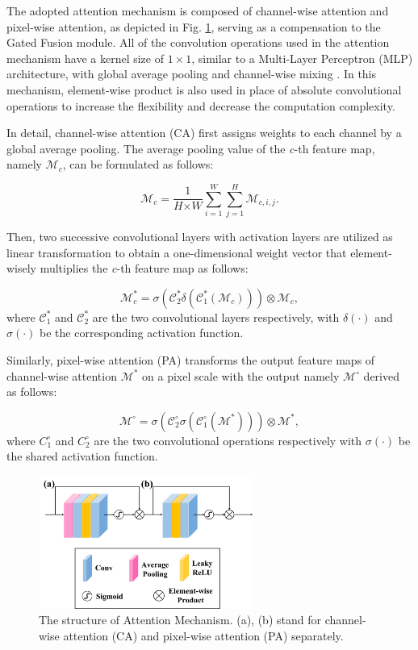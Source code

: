 \documentclass[lettersize,journal]{IEEEtran}
\begin{document}
The adopted attention mechanism is composed of channel-wise attention and pixel-wise attention, as depicted in Fig. \ref{attention}, serving as a compensation to the Gated Fusion module. All of the convolution operations used in the attention mechanism have a kernel size of $1 \times 1$, similar to a Multi-Layer Perceptron (MLP) architecture, with global average pooling and channel-wise mixing \cite{NEURIPS2021_mlp}.  In this mechanism, element-wise product is also used in place of absolute convolutional operations to increase the flexibility and decrease the computation complexity.   

In detail, channel-wise attention (CA) first assigns weights to each channel by a global average pooling. The average pooling value of the \textit{c}-th feature map, namely $\mathcal{M}_{c}$, can be formulated as follows:

\begin{equation}
    \mathcal{M}_{c} = \frac{1}{\textit{H} \times \textit{W}} \sum_{i=1}^\textit{W} \sum_{j=1}^\textit{H} \mathcal{M}_{c,i,j}.
\end{equation}

Then, two successive convolutional layers with activation layers are utilized as linear transformation to obtain a one-dimensional weight vector that element-wisely multiplies the \textit{c}-th feature map as follows:

\begin{equation}
    \mathcal{M}_c^* = \sigma(\mathcal{C}_2^* \delta (\mathcal{C}_1^*(\mathcal{M}_c))) \otimes \mathcal{M}_c,
\end{equation}
where $\mathcal{C}_1^*$ and $\mathcal{C}_2^*$ are the two convolutional layers respectively, with $\delta(\cdot)$ and $\sigma(\cdot)$ be the corresponding activation function. 

Similarly, pixel-wise attention (PA) transforms the output feature maps of channel-wise attention $\mathcal{M}^*$ on a pixel scale with the output namely $\mathcal{M}^{\circ}$ derived as follows:

\begin{equation}
    \mathcal{M}^{\circ} = \sigma(\mathcal{C}_2^{\circ} \sigma (\mathcal{C}_1^{\circ}(\mathcal{M}^*))) \otimes \mathcal{M}^*, 
\end{equation}
where $C_1^{\circ}$ and $C_2^{\circ}$ are the two convolutional operations respectively with $\sigma(\cdot)$ be the shared activation function. 

\begin{figure}[H]
    \centering
    \includegraphics[width=7cm]{figure2.png}
    \caption{The structure of Attention Mechanism. (a), (b) stand for channel-wise attention (CA) and pixel-wise attention (PA) separately. }
    \label{attention}
\end{figure}
\end{document}
